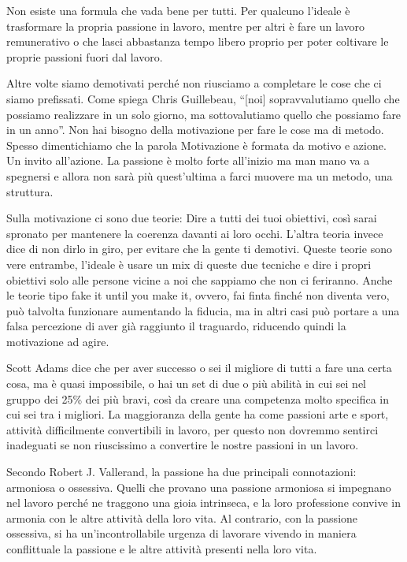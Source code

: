 \documentclass[12pt]{book} %
\begin{document}
\begin{mdframed}[linewidth=1pt]
Non esiste una formula che vada bene per tutti. Per qualcuno l'ideale è trasformare la propria
passione in lavoro, mentre per altri è fare un lavoro remunerativo o che lasci abbastanza tempo libero proprio per
poter coltivare le proprie passioni fuori dal lavoro.

Altre volte siamo demotivati perché non riusciamo a completare le cose che ci siamo prefissati. Come spiega Chris
Guillebeau, “[noi] sopravvalutiamo quello che possiamo realizzare in un solo giorno, ma sottovalutiamo quello che
possiamo fare in un anno”. Non hai bisogno della motivazione per fare le cose ma di metodo. Spesso dimentichiamo che la
parola Motivazione è formata da motivo e azione. Un invito all'azione. La passione è molto forte all'inizio ma man mano va a spegnersi e allora
non sarà più quest'ultima a farci muovere ma un metodo, una struttura.

Sulla motivazione ci sono due teorie: 
Dire a tutti dei tuoi obiettivi, così sarai spronato per mantenere la coerenza davanti ai loro occhi.
L'altra teoria invece dice di non dirlo in giro, per evitare che la gente ti demotivi. Queste teorie sono vere entrambe, l'ideale è usare un mix di queste due tecniche e dire i propri obiettivi solo alle persone vicine a noi che sappiamo che non ci feriranno.
Anche le teorie tipo fake it until you make it, ovvero, fai finta finché non diventa vero, può talvolta funzionare aumentando la fiducia, ma in altri casi può portare a una falsa percezione di aver già raggiunto il traguardo, riducendo quindi la motivazione ad agire.

Scott Adams dice che per aver successo o sei il migliore di tutti a fare una certa cosa, ma è quasi impossibile, o hai
un set di due o più abilità in cui sei nel gruppo dei 25\% dei più bravi, così da creare una competenza molto specifica
in cui sei tra i migliori. La maggioranza della gente ha come passioni arte e sport, attività difficilmente
convertibili in lavoro, per questo non dovremmo sentirci inadeguati se non riuscissimo a convertire le nostre passioni
in un lavoro.

Secondo Robert J. Vallerand, la passione ha due principali connotazioni: armoniosa o ossessiva. Quelli che provano una
passione armoniosa si impegnano nel lavoro perché ne traggono una gioia intrinseca, e la loro professione convive in
armonia con le altre attività della loro vita. Al contrario, con la passione ossessiva, si ha
un'incontrollabile urgenza di lavorare vivendo in maniera conflittuale la passione e le altre
attività presenti nella loro vita.


\end{mdframed}
\end{document}

